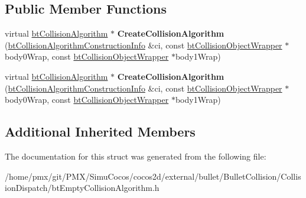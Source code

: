 \subsection*{Public Member Functions}
\begin{DoxyCompactItemize}
\item 
\mbox{\label{structbtEmptyAlgorithm_1_1CreateFunc_a51d47b69b6e5811adb4e0dfb932d2d09}} 
virtual \hyperlink{classbtCollisionAlgorithm}{bt\+Collision\+Algorithm} $\ast$ {\bfseries Create\+Collision\+Algorithm} (\hyperlink{structbtCollisionAlgorithmConstructionInfo}{bt\+Collision\+Algorithm\+Construction\+Info} \&ci, const \hyperlink{structbtCollisionObjectWrapper}{bt\+Collision\+Object\+Wrapper} $\ast$body0\+Wrap, const \hyperlink{structbtCollisionObjectWrapper}{bt\+Collision\+Object\+Wrapper} $\ast$body1\+Wrap)
\item 
\mbox{\label{structbtEmptyAlgorithm_1_1CreateFunc_a51d47b69b6e5811adb4e0dfb932d2d09}} 
virtual \hyperlink{classbtCollisionAlgorithm}{bt\+Collision\+Algorithm} $\ast$ {\bfseries Create\+Collision\+Algorithm} (\hyperlink{structbtCollisionAlgorithmConstructionInfo}{bt\+Collision\+Algorithm\+Construction\+Info} \&ci, const \hyperlink{structbtCollisionObjectWrapper}{bt\+Collision\+Object\+Wrapper} $\ast$body0\+Wrap, const \hyperlink{structbtCollisionObjectWrapper}{bt\+Collision\+Object\+Wrapper} $\ast$body1\+Wrap)
\end{DoxyCompactItemize}
\subsection*{Additional Inherited Members}


The documentation for this struct was generated from the following file\+:\begin{DoxyCompactItemize}
\item 
/home/pmx/git/\+P\+M\+X/\+Simu\+Cocos/cocos2d/external/bullet/\+Bullet\+Collision/\+Collision\+Dispatch/bt\+Empty\+Collision\+Algorithm.\+h\end{DoxyCompactItemize}
